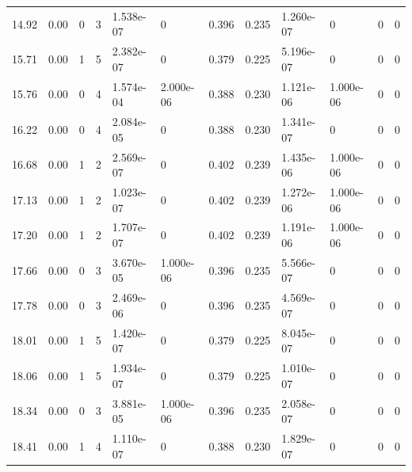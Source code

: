\documentclass[preview]{standalone}
\begin{document}
{{\begin{tabular}{L{1.2cm}C{1.2cm} C{0.3cm}C{0.5cm} C{1.4cm}C{1.4cm} C{1.4cm}C{1.4cm} C{1.6cm}C{1.6cm} C{1.6cm}C{1.6cm}}
  14.92  &  0.00  & 0     &  3 &  1.538e-07  & 0  &  0.396&   0.235& 1.260e-07 & 0   &  0 & 0  \\ 
  15.71  &  0.00  & 1     &  5 &  2.382e-07  & 0  &  0.379&   0.225& 5.196e-07 & 0   &  0 & 0  \\ 
  15.76  &  0.00  & 0     &  4 &  1.574e-04  & 2.000e-06  &  0.388&   0.230& 1.121e-06 & 1.000e-06   &  0 & 0  \\ 
  16.22  &  0.00  & 0     &  4 &  2.084e-05  & 0  &  0.388&   0.230& 1.341e-07 & 0   &  0 & 0  \\ 
  16.68  &  0.00  & 1     &  2 &  2.569e-07  & 0  &  0.402&   0.239& 1.435e-06 & 1.000e-06   &  0 & 0  \\ 
  17.13  &  0.00  & 1     &  2 &  1.023e-07  & 0  &  0.402&   0.239& 1.272e-06 & 1.000e-06   &  0 & 0  \\ 
  17.20  &  0.00  & 1     &  2 &  1.707e-07  & 0  &  0.402&   0.239& 1.191e-06 & 1.000e-06   &  0 & 0  \\ 
  17.66  &  0.00  & 0     &  3 &  3.670e-05  & 1.000e-06  &  0.396&   0.235& 5.566e-07 & 0   &  0 & 0  \\ 
  17.78  &  0.00  & 0     &  3 &  2.469e-06  & 0  &  0.396&   0.235& 4.569e-07 & 0   &  0 & 0  \\ 
  18.01  &  0.00  & 1     &  5 &  1.420e-07  & 0  &  0.379&   0.225& 8.045e-07 & 0   &  0 & 0  \\ 
  18.06  &  0.00  & 1     &  5 &  1.934e-07  & 0  &  0.379&   0.225& 1.010e-07 & 0   &  0 & 0  \\ 
  18.34  &  0.00  & 0     &  3 &  3.881e-05  & 1.000e-06  &  0.396&   0.235& 2.058e-07 & 0   &  0 & 0  \\ 
  18.41  &  0.00  & 1     &  4 &  1.110e-07  & 0  &  0.388&   0.230& 1.829e-07 & 0   &  0 & 0  \\ 
\hline 
\end{tabular} 

}}
\end{document}
